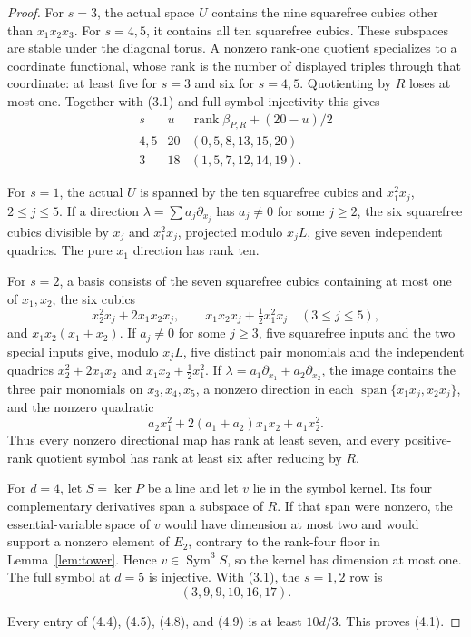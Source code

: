 \documentclass[11pt]{amsart}
\newcommand{\Sym}{\operatorname{Sym}}
\newcommand{\Span}{\operatorname{span}}
\newcommand{\rank}{\operatorname{rank}}
\theoremstyle{definition}
\begin{document}
\begin{proof}
For \(s=3\), the actual space \(U\) contains the nine squarefree cubics
other than \(x_1x_2x_3\). For \(s=4,5\), it contains all ten squarefree
cubics. These subspaces are stable under the diagonal torus. A nonzero
rank-one quotient specializes to a coordinate functional, whose rank is the
number of displayed triples through that coordinate: at least five for
\(s=3\) and six for \(s=4,5\). Quotienting by \(R\) loses at most one.
Together with (3.1) and full-symbol injectivity this gives
\[
\begin{array}{c|c|c}
s&u&\rank\beta_{P,R}+(20-u)/2\\ \hline
4,5&20&(0,5,8,13,15,20)\\
3&18&(1,5,7,12,14,19).
\end{array} \tag{4.8}
\]

For \(s=1\), the actual \(U\) is spanned by the ten squarefree cubics and
\(x_1^2x_j\), \(2\le j\le5\). If a direction
\(\lambda=\sum a_j\partial_{x_j}\) has \(a_j\ne0\) for some \(j\ge2\),
the six squarefree cubics divisible by \(x_j\) and \(x_1^2x_j\), projected
modulo \(x_jL\), give seven independent quadrics. The pure \(x_1\)
direction has rank ten.

For \(s=2\), a basis consists of the seven squarefree cubics containing at
most one of \(x_1,x_2\), the six cubics
\[
 x_2^2x_j+2x_1x_2x_j,\qquad
 x_1x_2x_j+\tfrac12x_1^2x_j\quad(3\le j\le5),
\]
and \(x_1x_2(x_1+x_2)\). If \(a_j\ne0\) for some \(j\ge3\), five
squarefree inputs and the two special inputs give, modulo \(x_jL\), five
distinct pair monomials and the independent quadrics
\(x_2^2+2x_1x_2\) and \(x_1x_2+\tfrac12x_1^2\). If
\(\lambda=a_1\partial_{x_1}+a_2\partial_{x_2}\), the image contains the
three pair monomials on \(x_3,x_4,x_5\), a nonzero direction in each
\(\Span\{x_1x_j,x_2x_j\}\), and the nonzero quadratic
\[
 a_2x_1^2+2(a_1+a_2)x_1x_2+a_1x_2^2.
\]
Thus every nonzero directional map has rank at least seven, and every
positive-rank quotient symbol has rank at least six after reducing by \(R\).

For \(d=4\), let \(S=\ker P\) be a line and let \(v\) lie in the symbol
kernel. Its four complementary derivatives span a subspace of \(R\). If
that span were nonzero, the essential-variable space of \(v\) would have
dimension at most two and would support a nonzero element of \(E_2\),
contrary to the rank-four floor in Lemma~\ref{lem:tower}. Hence
\(v\in\Sym^3S\), so the kernel has dimension at most one. The full symbol at
\(d=5\) is injective. With (3.1), the \(s=1,2\) row is
\[
 (3,9,9,10,16,17). \tag{4.9}
\]

Every entry of (4.4), (4.5), (4.8), and (4.9) is at least \(10d/3\).
This proves (4.1).
\end{proof}
\end{document}
